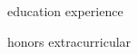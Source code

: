 \documentclass[12pt, letterpaper]{resume}
\author{Chris K. Thomas}
\newcommand*{\sectiondir}{resume/}
\begin{document}
\makecvheader

{education}
{experience}

{honors}
{extracurricular}
\end{document}
